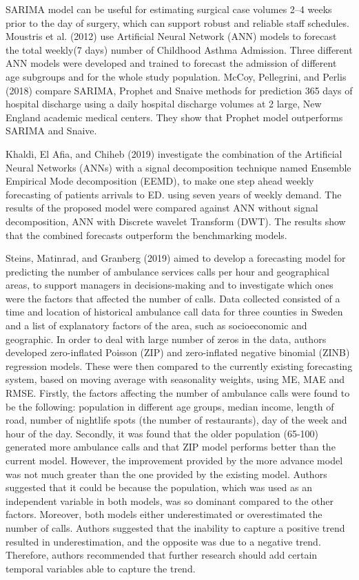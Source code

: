 \documentclass[]{elsarticle} %
\begin{document}
SARIMA model can be useful for estimating surgical case volumes 2--4 weeks prior to the day of surgery, which can support robust and reliable staff schedules.
Moustris et al. (2012) use Artificial Neural Network (ANN) models to forecast the total weekly(7 days) number of Childhood Asthma Admission. Three different ANN models were developed
and trained to forecast the admission of different age subgroups
and for the whole study population.
McCoy, Pellegrini, and Perlis (2018) compare SARIMA, Prophet and Snaive methods for prediction 365 days of hospital discharge using a daily hospital discharge volumes at 2 large, New England academic medical centers. They show that Prophet model outperforms SARIMA and Snaive.

Khaldi, El Afia, and Chiheb (2019) investigate the combination of the Artificial Neural Networks (ANNs) with a signal decomposition technique named Ensemble Empirical Mode decomposition (EEMD), to make one step ahead weekly forecasting of patients arrivals to ED. using seven years of weekly demand. The results of the proposed model were compared against ANN without signal decomposition, ANN with Discrete wavelet Transform (DWT). The results show that the combined forecasts outperform the benchmarking models.

Steins, Matinrad, and Granberg (2019) aimed to develop a forecasting model for predicting the number of ambulance services calls per hour and geographical areas, to support managers in decisions-making and to investigate which ones were the factors that affected the number of calls.
Data collected consisted of a time and location of historical ambulance call data for three counties in Sweden and a list of explanatory factors of the area, such as socioeconomic and geographic.
In order to deal with large number of zeros in the data, authors developed zero-inflated Poisson (ZIP) and zero-inflated negative binomial (ZINB) regression models. These were then compared to the currently existing forecasting system, based on moving average with seasonality weights, using ME, MAE and RMSE. Firstly, the factors affecting the number of ambulance calls were found to be the following: population in different age groups, median income, length of road, number of nightlife spots (the number of restaurants), day of the week and hour of the day. Secondly, it was found that the older population (65-100) generated more ambulance calls and that ZIP model performs better than the current model. However, the improvement provided by the more advance model was not much greater than the one provided by the existing model. Authors suggested that it could be because the population, which was used as an independent variable in both models, was so dominant compared to the other factors.
Moreover, both models either underestimated or overestimated the number of calls. Authors suggested that the inability to capture a positive trend resulted in underestimation, and the opposite was due to a negative trend. Therefore, authors recommended that further research should add certain temporal variables able to capture the trend.
\end{document}
